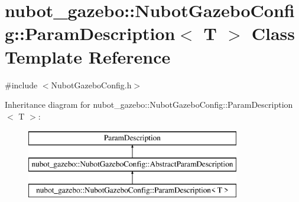 \hypertarget{classnubot__gazebo_1_1NubotGazeboConfig_1_1ParamDescription}{\section{nubot\-\_\-gazebo\-:\-:Nubot\-Gazebo\-Config\-:\-:Param\-Description$<$ T $>$ Class Template Reference}
\label{classnubot__gazebo_1_1NubotGazeboConfig_1_1ParamDescription}
}


{\ttfamily \#include $<$Nubot\-Gazebo\-Config.\-h$>$}

Inheritance diagram for nubot\-\_\-gazebo\-:\-:Nubot\-Gazebo\-Config\-:\-:Param\-Description$<$ T $>$\-:\begin{figure}[H]
\begin{center}
\leavevmode
\includegraphics[height=3.000000cm]{classnubot__gazebo_1_1NubotGazeboConfig_1_1ParamDescription}
\end{center}
\end{figure}

